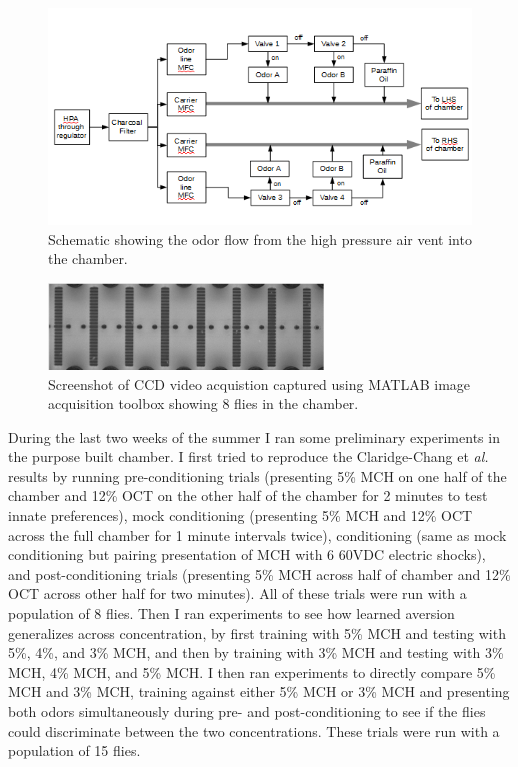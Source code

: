 \documentclass{article}
\begin{document}
\begin{figure}[h]
\begin{center}
\includegraphics[width=1\textwidth]{Figures/odor_flow_schematic}
\caption{Schematic showing the odor flow from the high pressure air vent into the chamber.}
\end{center}
\end{figure}

\begin{figure}[h]
\begin{center}
\includegraphics[width=0.65\textwidth]{Figures/image_acquisition}
\caption{Screenshot of CCD video acquistion captured using MATLAB image acquisition toolbox showing 8 flies in the chamber.}
\end{center}
\end{figure}

During the last two weeks of the summer I ran some preliminary experiments in the purpose built chamber. I first tried to reproduce the Claridge-Chang et \textit{al.} results by running pre-conditioning trials (presenting 5\% MCH on one half of the chamber and 12\% OCT on the other half of the chamber for 2 minutes to test innate preferences), mock conditioning (presenting 5\% MCH and 12\% OCT across the full chamber for 1 minute intervals twice), conditioning (same as mock conditioning but pairing presentation of MCH with 6 60VDC electric shocks), and post-conditioning trials (presenting 5\% MCH across half of chamber and 12\% OCT across other half for two minutes). All of these trials were run with a population of 8 flies. Then I ran experiments to see how learned aversion generalizes across concentration, by first training with 5\% MCH and testing with 5\%, 4\%, and 3\% MCH, and then by training with 3\% MCH and testing with 3\% MCH, 4\% MCH, and 5\% MCH. I then ran experiments to directly compare 5\% MCH and 3\% MCH, training against either 5\% MCH or 3\% MCH and presenting both odors simultaneously during pre- and post-conditioning to see if the flies could discriminate between the two concentrations. These trials were run with a population of 15 flies. \\
\end{document}
